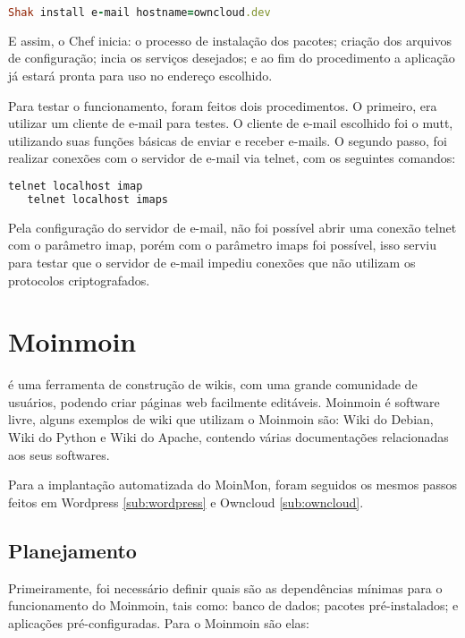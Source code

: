 \begin{lstlisting}[language=Ruby,label=dice_index,caption={Exemplo de execução de instalação do servidor de e-mail com shak}]
Shak install e-mail hostname=owncloud.dev
\end{lstlisting}


E assim, o Chef inicia: o processo de instalação dos pacotes; criação dos arquivos
de configuração; incia os serviços desejados; e ao fim do procedimento a aplicação
já estará pronta para uso no endereço escolhido.

Para testar o funcionamento, foram feitos dois procedimentos. O primeiro, era utilizar
um cliente de e-mail para testes. O cliente de e-mail escolhido foi o mutt, utilizando
suas funções básicas de enviar e receber e-mails. O segundo passo, foi realizar conexões
com o servidor de e-mail via telnet, com os seguintes comandos:

\begin{lstlisting}[language=Ruby,label=dice_index,caption={Exemplo de teste de conexão telnet no servidor imap}]
   telnet localhost imap
   telnet localhost imaps
\end{lstlisting}

Pela configuração do servidor de e-mail, não foi possível abrir uma conexão telnet
com o parâmetro imap, porém com o parâmetro imaps foi possível, isso serviu para testar 
que o servidor de e-mail impediu conexões que não 
utilizam os protocolos criptografados.

\section{Moinmoin}
\label{sub:moinmoin}

\cite{moin} é uma ferramenta de construção
de wikis, com uma grande comunidade de usuários, podendo criar páginas web
facilmente editáveis. Moinmoin é software livre, alguns exemplos
de wiki que utilizam o Moinmoin são: Wiki do Debian, Wiki do Python e Wiki do Apache,
contendo várias documentações relacionadas aos seus softwares. 

Para a implantação automatizada do MoinMon, foram seguidos os mesmos passos
feitos em Wordpress \ref{sub:wordpress} e Owncloud \ref{sub:owncloud}.

\subsection{Planejamento}

Primeiramente, foi necessário definir quais são as dependências
mínimas para o funcionamento do Moinmoin, tais como: banco de dados; pacotes
pré-instalados; e aplicações pré-configuradas. Para o Moinmoin são elas:

